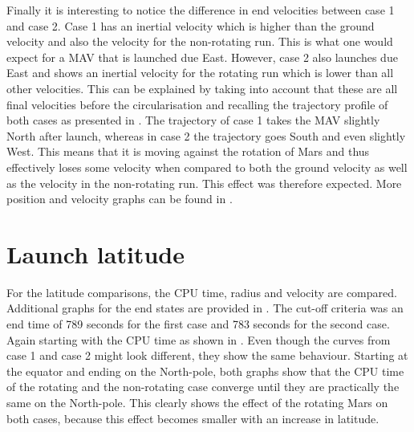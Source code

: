 \noindent
Finally it is interesting to notice the difference in end velocities between case 1 and case 2. Case 1 has an inertial velocity which is higher than the ground velocity and also the velocity for the non-rotating run. This is what one would expect for a \ac{MAV} that is launched due East. However, case 2 also launches due East and shows an inertial velocity for the rotating run which is lower than all other velocities. This can be explained by taking into account that these are all final velocities before the circularisation and recalling the trajectory profile of both cases as presented in . The trajectory of case 1 takes the \ac{MAV} slightly North after launch, whereas in case 2 the trajectory goes South and even slightly West. This means that it is moving against the rotation of Mars and thus effectively loses some velocity when compared to both the ground velocity as well as the velocity in the non-rotating run. This effect was therefore expected.
More position and velocity graphs can be found in .

%





\section{Launch latitude}
\label{sec:launchLatitude}
For the latitude comparisons, the CPU time, radius and velocity are compared. Additional graphs for the end states are provided in . The cut-off criteria was an end time of 789 seconds for the first case and 783 seconds for the second case. Again starting with the CPU time as shown in . Even though the curves from case 1 and case 2 might look different, they show the same behaviour. Starting at the equator and ending on the North-pole, both graphs show that the CPU time of the rotating and the non-rotating case converge until they are practically the same on the North-pole. This clearly shows the effect of the rotating Mars on both cases, because this effect becomes smaller with an increase in latitude.



